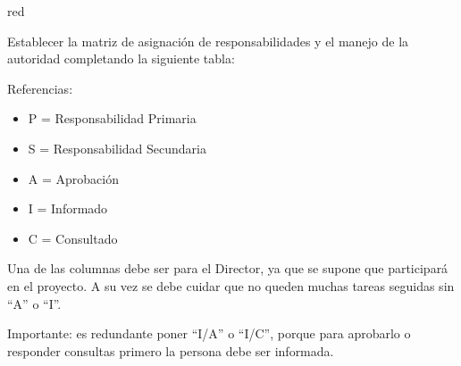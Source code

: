 \documentclass[11pt]{charter}
\begin{document}
\begin{consigna}{red}
\begin{enumerate}
\begin{enumerate}
	\end{enumerate}

\end{enumerate}
Establecer la matriz de asignación de responsabilidades y el manejo de la autoridad completando la siguiente tabla:

\begin{table}[htpb]
\centering
{}
\end{table}

{\footnotesize
Referencias:
\begin{itemize}
	\item P = Responsabilidad Primaria
	\item S = Responsabilidad Secundaria
	\item A = Aprobación
	\item I = Informado
	\item C = Consultado
\end{itemize}
} %

Una de las columnas debe ser para el Director, ya que se supone que participará en el proyecto.
A su vez se debe cuidar que no queden muchas tareas seguidas sin ``A'' o ``I''.

Importante: es redundante poner ``I/A'' o ``I/C'', porque para aprobarlo o responder consultas primero la persona debe ser informada.

\end{consigna}
\end{document}
